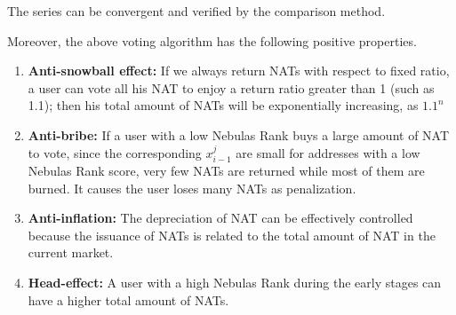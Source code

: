 The series can be convergent and verified by the comparison method.

Moreover, the above voting algorithm has the following positive properties.
\begin{enumerate}
	\item \textbf{Anti-snowball effect:} If we always return NATs  with respect to fixed ratio, a user can vote all his  NAT to enjoy a return ratio greater than 1 (such as 1.1); then his total amount of  NATs will be exponentially increasing, as  $1.1^n$ 
	\item \textbf{Anti-bribe:} If a user with a low Nebulas Rank buys a large amount of NAT to vote, since the corresponding $x_{i-1}^j$ are small for addresses with a low Nebulas Rank score, very few NATs are returned while most of them are burned. It causes the user loses many NATs as penalization.
	\item \textbf{Anti-inflation:} The depreciation of NAT can be effectively controlled because the issuance of NATs is related to the total amount of NAT in the current market.
	\item \textbf{Head-effect:} A user with a high Nebulas Rank during the early stages can have a higher total amount of NATs.
\end{enumerate}
